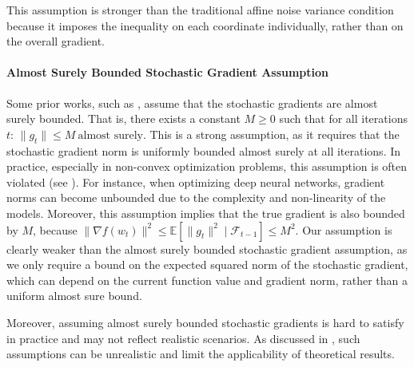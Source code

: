 \documentclass{article} %
\begin{document}
This assumption is stronger than the traditional affine noise variance condition because it imposes the inequality on each coordinate individually, rather than on the overall gradient.

\paragraph{Almost Surely Bounded Stochastic Gradient Assumption}

Some prior works, such as \cite{he2023convergence, xiao2024adam}, assume that the stochastic gradients are almost surely bounded. That is, there exists a constant \( M \geq 0 \) such that for all iterations \( t \):
\(\|g_t\| \leq M \  \text{almost surely}.\)
This is a strong assumption, as it requires that the stochastic gradient norm is uniformly bounded almost surely at all iterations. In practice, especially in non-convex optimization problems, this assumption is often violated (see \citealt{wang2023convergence}). For instance, when optimizing deep neural networks, gradient norms can become unbounded due to the complexity and non-linearity of the models. Moreover, this assumption implies that the true gradient is also bounded by \( M \), because
\(\|\nabla f(w_{t})\|^{2} \leq \mathbb{E}[\|g_{t}\|^{2} \mid \mathscr{F}_{t-1}] \leq M^{2}.\)
Our assumption is clearly weaker than the almost surely bounded stochastic gradient assumption, as we only require a bound on the expected squared norm of the stochastic gradient, which can depend on the current function value and gradient norm, rather than a uniform almost sure bound.

Moreover, assuming almost surely bounded stochastic gradients is hard to satisfy in practice and may not reflect realistic scenarios. As discussed in \cite{wang2023convergence,DBLP:journals/tmlr/KhaledR23}, such assumptions can be unrealistic and limit the applicability of theoretical results.



\end{document}
